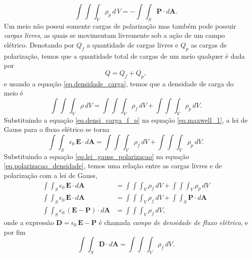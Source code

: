 \begin{equation}\label{eq.polarizacao_densidade}
\int\int\int_V\rho_p\,d\,V=-\int\int_S\mathbf{P}\cdot d\mathbf{A}.
\end{equation}
Um meio não possui somente cargas de polarização mas também pode possuir \textit{cargas livres}, as quais se movimentam livremente sob a ação de um campo elétrico. Denotando por $Q_f$ a quantidade de cargas livres e $Q_p$ as cargas de polarização, temos que a quantidade total de cargas de um meio qualquer é dada por
\begin{equation*}
Q=Q_f+Q_p,
\end{equation*} 
e usando a equação \ref{eq.densidade_carga}, temos que a densidade de carga do meio é
\begin{equation}\label{eq.densi_carga_f_p}
\int\int\int_{V}\rho\,dV=\int\int\int_{V}\rho_f\,dV+\int\int\int_{V}\rho_p\,dV.
\end{equation}
Substituindo a equação \ref{eq.densi_carga_f_p} na equação \ref{eq.maxwell_1}, a lei de Gauss para o fluxo elétrico se torna
\begin{equation}\label{eq.lei_gauss_polarizacao}
\int\int_S\epsilon_0\,\mathbf{E}\cdot d\mathbf{A}=\int\int\int_{V}\rho_f\,dV+\int\int\int_{V}\rho_p\,dV.
\end{equation}
Substituindo a equação \ref{eq.lei_gauss_polarizacao} na equação \ref{eq.polarizacao_densidade}, temos uma relação entre as cargas livres e de polarização com a lei de Gauss,
\begin{align*}
\int\int_S\epsilon_0\,\mathbf{E}\cdot d\mathbf{A}&=\int\int\int_{V}\rho_f\,dV+\int\int\int_{V}\rho_p\,dV\\
\int\int_S\epsilon_0\,\mathbf{E}\cdot d\mathbf{A}&=\int\int\int_{V}\rho_f\,dV+\int\int_S\mathbf{P}\cdot d\mathbf{A}\\
\int\int_S\epsilon_0\,(\mathbf{E}-\mathbf{P})\cdot d\mathbf{A}&=\int\int\int_{V}\rho_f\,dV,
\end{align*}
onde a expressão $\mathbf{D}=\epsilon_0\,\mathbf{E}-\mathbf{P}$ é chamada \textit{campo de densidade de fluxo elétrico}, e por fim
\begin{equation*}
\int\int_S\mathbf{D}\cdot d\mathbf{A}=\int\int\int_{V}\rho_f\,dV.
\end{equation*}

